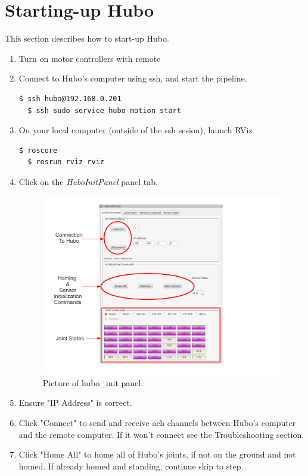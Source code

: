 \documentclass[letterpaper, 10 pt]{report}
\begin{document}
\section{Starting-up Hubo}
This section describes how to start-up Hubo.
\begin{enumerate}
  \item Turn on motor controllers with remote
  \item Connect to Hubo's computer using ssh, and start the pipeline.
  \begin{lstlisting}[language=bash]
  $ ssh hubo@192.168.0.201
  $ ssh sudo service hubo-motion start
  \end{lstlisting}
  \item On your local computer (outside of the ssh sesion), launch RViz
  \begin{lstlisting}[language=bash]
  $ roscore
  $ rosrun rviz rviz
  \end{lstlisting}
  \item Click on the \textit{HuboInitPanel} panel tab.
  \begin{figure}[ht]
    \centering
    \includegraphics[width=15.0cm]{figures/hubo-init.pdf}
    \caption{Picture of hubo\_init panel.}
    \label{fig:hubo-init-image}
  \end{figure}
  \item Ensure "IP Address" is correct.
  \item Click "Connect" to send and receive ach channels between Hubo's computer and the remote computer. If it won't connect see the Troubleshooting section.
  \item Click "Home All" to home all of Hubo's joints, if not on the ground and not homed. If already homed and standing, continue skip to step.

\end{enumerate}
\end{document}
